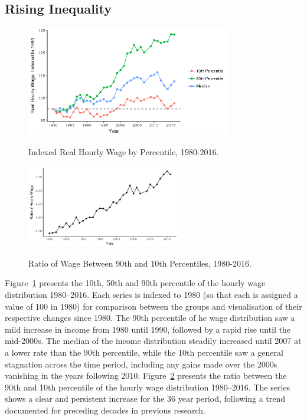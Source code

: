 \documentclass[notitlepage,12pt]{article}
\newcommand{\1}[1]{\ensuremath{\mathbb{1}\left( #1 \right)}}               %
\begin{document}
\subsection{Rising Inequality}
\begin{figure}[H]
  \centering
  \caption{Indexed Real Hourly Wage by Percentile, 1980-2016.}
  \includegraphics[width=0.8\textwidth]{figures/Ineq_graph.png}
  \label{fig:wages_percentile}
\end{figure}
\begin{figure}[b]
  \centering
  \caption{Ratio of Wage Between 90th and 10th Percentiles, 1980-2016.}
  \includegraphics[width=0.6\textwidth]{figures/Ratio_plot1.png}
  \label{fig:ratios_percentile}
\end{figure}
Figure~\ref{fig:wages_percentile} presents the 10th, 50th and 90th percentile of the hourly wage distribution 1980--2016.  Each series is indexed to 1980 (so that each is assigned a value of 100 in 1980) for comparison between the groups and visualisation of their respective changes since 1980.  The 90th percentile of he wage distribution saw a mild increase in income from 1980 until 1990, followed by a rapid rise until the mid-2000s.  The median of the income distribution steadily increased until 2007 at a lower rate than the 90th percentile, while the 10th percentile saw a general stagnation across the time period, including any gains made over the 2000s vanishing in the years following 2010.  Figure~\ref{fig:ratios_percentile} presents the ratio between the 90th and 10th percentile of the hourly wage distribution 1980--2016.  The series shows a clear and persistent increase for the 36 year period, following a trend documented for preceding decades in previous research.
\end{document}
